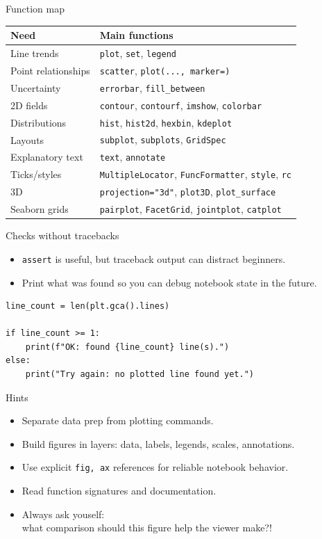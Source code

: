 \documentclass[aspectratio=43,11pt]{beamer}
\begin{document}
\begin{frame}{Function map}
\small
\begin{tabular}{ll}
\toprule
Need & Main functions \\
\midrule
Line trends & \texttt{plot}, \texttt{set}, \texttt{legend} \\
Point relationships & \texttt{scatter}, \texttt{plot(..., marker=)} \\
Uncertainty & \texttt{errorbar}, \texttt{fill\_between} \\
2D fields & \texttt{contour}, \texttt{contourf}, \texttt{imshow}, \texttt{colorbar} \\
Distributions & \texttt{hist}, \texttt{hist2d}, \texttt{hexbin}, \texttt{kdeplot} \\
Layouts & \texttt{subplot}, \texttt{subplots}, \texttt{GridSpec} \\
Explanatory text & \texttt{text}, \texttt{annotate} \\
Ticks/styles & \texttt{MultipleLocator}, \texttt{FuncFormatter}, \texttt{style}, \texttt{rc} \\
3D & \texttt{projection="3d"}, \texttt{plot3D}, \texttt{plot\_surface} \\
Seaborn grids & \texttt{pairplot}, \texttt{FacetGrid}, \texttt{jointplot}, \texttt{catplot} \\
\bottomrule
\end{tabular}
\end{frame}

\begin{frame}[fragile]{Checks without tracebacks}
\begin{itemize}
  \item \texttt{assert} is useful, but traceback output can distract beginners.
  \item Print what was found so you can debug notebook state in the future.
\end{itemize}

\begin{lstlisting}
line_count = len(plt.gca().lines)

if line_count >= 1:
    print(f"OK: found {line_count} line(s).")
else:
    print("Try again: no plotted line found yet.")
\end{lstlisting}
\end{frame}

\begin{frame}{Hints}
\begin{itemize}
  \item Separate data prep from plotting commands.
  \item Build figures in layers: data, labels, legends, scales, annotations.
  \item Use explicit \texttt{fig, ax} references for reliable notebook behavior.
  \item Read function signatures and documentation.
  \item Always ask youself:\\what comparison should this figure help the viewer make?!
\end{itemize}
\end{frame}
\end{document}
